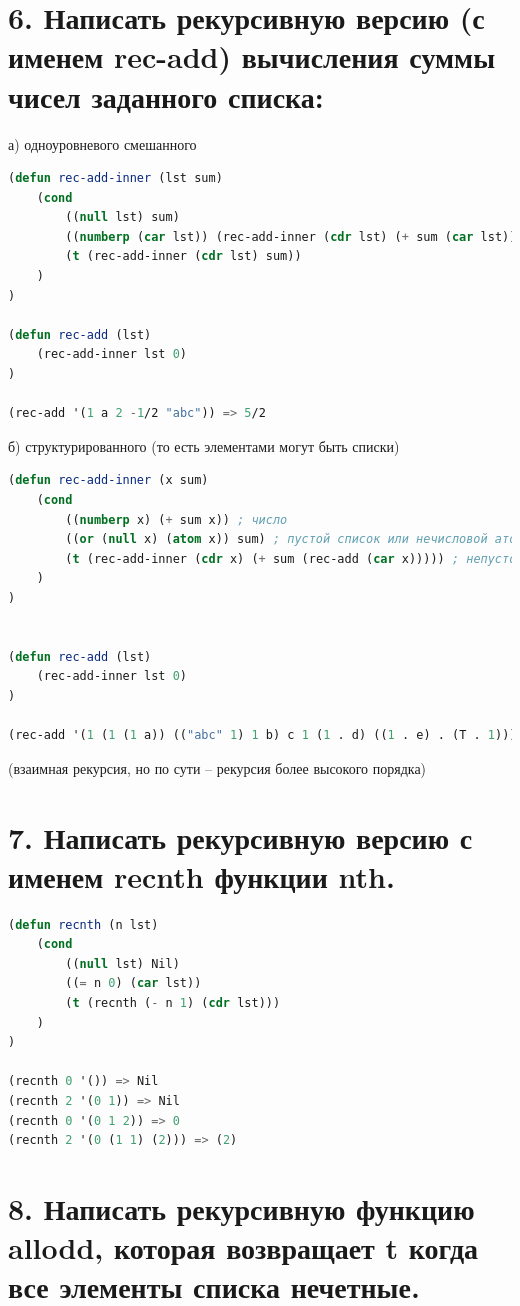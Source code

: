 \documentclass[12pt]{report}
\begin{document}
\section*{6. Написать рекурсивную версию (с именем rec-add) вычисления суммы чисел заданного списка:}

а) одноуровневого смешанного

\begin{lstlisting}[language=Lisp]
(defun rec-add-inner (lst sum)
	(cond 
		((null lst) sum)
		((numberp (car lst)) (rec-add-inner (cdr lst) (+ sum (car lst))))
		(t (rec-add-inner (cdr lst) sum))
	)
)
	
(defun rec-add (lst)
	(rec-add-inner lst 0)
)

(rec-add '(1 a 2 -1/2 "abc")) => 5/2
\end{lstlisting}

б) структурированного (то есть элементами могут быть списки)

\begin{lstlisting}[language=Lisp]
(defun rec-add-inner (x sum)
	(cond 
		((numberp x) (+ sum x)) ; число
		((or (null x) (atom x)) sum) ; пустой список или нечисловой атом
		(t (rec-add-inner (cdr x) (+ sum (rec-add (car x))))) ; непустой список или точечная пара
	)
)


(defun rec-add (lst)
	(rec-add-inner lst 0)
)

(rec-add '(1 (1 (1 a)) (("abc" 1) 1 b) c 1 (1 . d) ((1 . e) . (T . 1)))) => 9
\end{lstlisting}

(взаимная рекурсия, но по сути -- рекурсия более высокого порядка)


\section*{7. Написать рекурсивную версию с именем recnth функции nth.}

\begin{lstlisting}[language=Lisp]
(defun recnth (n lst)
	(cond
		((null lst) Nil)
		((= n 0) (car lst))
		(t (recnth (- n 1) (cdr lst)))
	)
)

(recnth 0 '()) => Nil
(recnth 2 '(0 1)) => Nil
(recnth 0 '(0 1 2)) => 0
(recnth 2 '(0 (1 1) (2))) => (2)
\end{lstlisting}



\clearpage
\section*{8. Написать рекурсивную функцию allodd, которая возвращает t когда все элементы списка нечетные.}
\end{document}

